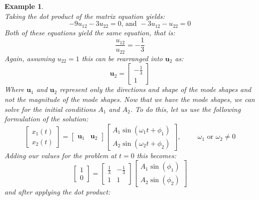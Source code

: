 \documentclass[12pt,letter]{article}
\newtheorem{ex}{Example}
\numberwithin{ex}{section} %
\newenvironment{example}{\begin{mdframed}[middlelinewidth=0.5mm]\begin{ex}\normalfont}{\end{ex}\end{mdframed}}
\numberwithin{re}{section} %
\begin{document}
\begin{example}
\begin{equation}
\end{equation}
Taking the dot product of the matrix equation yields:
\begin{equation}
	-9u_{12} -3u_{22}=0 \text{, and } -3u_{12} - u_{22}=0
\end{equation}
Both of these equations yield the same equation, that is:
\begin{equation}
	\frac{u_{12}}{u_{22}} =-\frac{1}{3}
\end{equation}
Again, assuming $u_{22}=1$  this can be rearranged into $\textbf{u}_2$ as:
\begin{equation}
	 \textbf{u}_2 = \begin{bmatrix} -\frac{1}{3}\\ 1\end{bmatrix}
\end{equation}
Where $\mathbf{u}_1$ and $\mathbf{u}_2$ represent only the directions and shape of the mode shapes and not the magnitude of the mode shapes. 
Now that we have the mode shapes, we can solve for the initial conditions $A_1$ and $A_2$. To do this, let us use the following formulation of the solution:
\begin{equation}
	 \begin{bmatrix} x_1(t) \\  x_2(t) \end{bmatrix} =  \begin{bmatrix} \mathbf{u}_1 & \mathbf{u}_2 \end{bmatrix}
	 \begin{bmatrix} A_1 \sin (\omega_1 t + \phi_1 )\\ A_2 \sin (\omega_2 t + \phi_2 )\end{bmatrix}, \hspace{1cm} \omega_1 \text{ or } \omega_2 \neq 0
\end{equation}
Adding our values for the problem at $t=0$ this becomes:
\begin{equation}
	 \begin{bmatrix} 1 \\  0 \end{bmatrix} =  \begin{bmatrix} \frac{1}{3} & -\frac{1}{3} \\ 1 & 1 \end{bmatrix}
	 \begin{bmatrix} A_1 \sin (\phi_1)\\ A_2 \sin (\phi_2)\end{bmatrix}
\end{equation}
and after applying the dot product:

\end{example}
\end{document}
